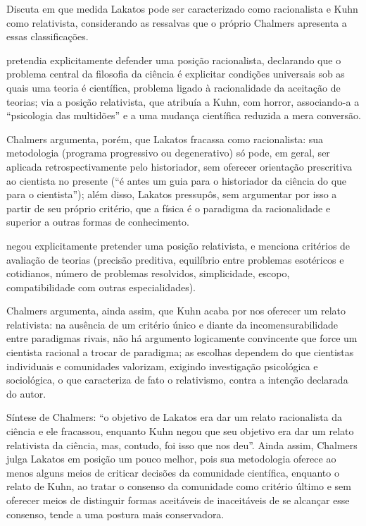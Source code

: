 \documentclass[10pt]{extarticle}
\newcommand{\resposta}[1]{\par\smallskip\noindent #1}
\begin{document}
\begin{questoes}
\item Discuta em que medida Lakatos pode ser caracterizado como racionalista e Kuhn como relativista, considerando as ressalvas que o próprio Chalmers apresenta a essas classificações.

\resposta{
\begin{topicos}
\item[Lakatos:] pretendia explicitamente defender uma posição racionalista, declarando que o problema central da filosofia da ciência é explicitar condições universais sob as quais uma teoria é científica, problema ligado à racionalidade da aceitação de teorias; via a posição relativista, que atribuía a Kuhn, com horror, associando-a a \enquote{psicologia das multidões} e a uma mudança científica reduzida a mera conversão.
\item Chalmers argumenta, porém, que Lakatos fracassa como racionalista: sua metodologia (programa progressivo ou degenerativo) só pode, em geral, ser aplicada retrospectivamente pelo historiador, sem oferecer orientação prescritiva ao cientista no presente (\enquote{é antes um guia para o historiador da ciência do que para o cientista}); além disso, Lakatos pressupôs, sem argumentar por isso a partir de seu próprio critério, que a física é o paradigma da racionalidade e superior a outras formas de conhecimento.
\item[Kuhn:] negou explicitamente pretender uma posição relativista, e menciona critérios de avaliação de teorias (precisão preditiva, equilíbrio entre problemas esotéricos e cotidianos, número de problemas resolvidos, simplicidade, escopo, compatibilidade com outras especialidades).
\item Chalmers argumenta, ainda assim, que Kuhn acaba por nos oferecer um relato relativista: na ausência de um critério único e diante da incomensurabilidade entre paradigmas rivais, não há argumento logicamente convincente que force um cientista racional a trocar de paradigma; as escolhas dependem do que cientistas individuais e comunidades valorizam, exigindo investigação psicológica e sociológica, o que caracteriza de fato o relativismo, contra a intenção declarada do autor.
\item Síntese de Chalmers: \enquote{o objetivo de Lakatos era dar um relato racionalista da ciência e ele fracassou, enquanto Kuhn negou que seu objetivo era dar um relato relativista da ciência, mas, contudo, foi isso que nos deu}. Ainda assim, Chalmers julga Lakatos em posição um pouco melhor, pois sua metodologia oferece ao menos alguns meios de criticar decisões da comunidade científica, enquanto o relato de Kuhn, ao tratar o consenso da comunidade como critério último e sem oferecer meios de distinguir formas aceitáveis de inaceitáveis de se alcançar esse consenso, tende a uma postura mais conservadora.
\end{topicos}
}


\end{questoes}
\end{document}
